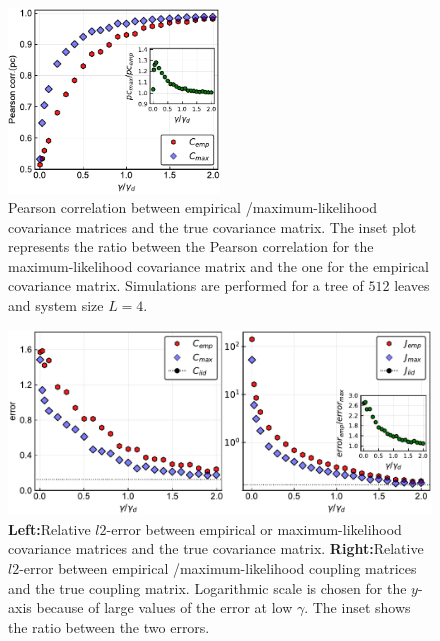 \documentclass[preprint,amsmath,amssymb,superscriptaddress,showpacs,pre]{revtex4-1}
\begin{document}
\begin{figure}[!htb]
	\centering
	\includegraphics[keepaspectratio=true,width=0.5\textwidth]{Figures/corr_C_L4_balanced_tree_100_rep.pdf}
	\caption{ Pearson correlation between empirical /maximum-likelihood   covariance matrices and the true covariance matrix. The inset plot represents the ratio between the Pearson correlation for the  maximum-likelihood covariance matrix and the one for the empirical covariance matrix. Simulations are performed for a tree of $512$ leaves  and  system size $L=4$.}
	\label{fig:pears_L4}
\end{figure}



\begin{figure}[!htb]
			\centering\includegraphics[keepaspectratio=true,width=1.0\textwidth]{Figures/epsilon_error_L4_balanced_tree_100.pdf}
		\hspace{1mm}
	\caption{\textbf{Left:}Relative $l2$-error between empirical or maximum-likelihood  covariance matrices and the true covariance matrix.  \textbf{Right:}Relative $l2$-error between empirical /maximum-likelihood  coupling matrices and the true coupling matrix. Logarithmic scale is chosen for the $y$-axis because of large values of the error at low $\gamma$. The inset shows the ratio between the two errors.}
	\label{fig:error_1_L4}
\end{figure}
\end{document}
